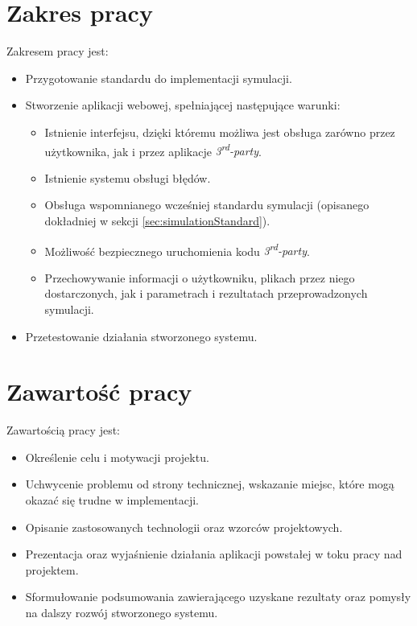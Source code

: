 
\section{Zakres pracy}
\label{sec:zakresPracy}

Zakresem pracy jest:
\begin{itemize}
	\item Przygotowanie standardu do implementacji symulacji.
	\item Stworzenie aplikacji webowej, spełniającej następujące warunki:
	      \begin{itemize}
		      \item Istnienie interfejsu, dzięki któremu możliwa jest obsługa zarówno przez użytkownika, jak i przez aplikacje \emph{3\textsuperscript{rd}-party}.
		      \item Istnienie systemu obsługi błędów.
		      \item Obsługa wspomnianego wcześniej standardu symulacji (opisanego dokładniej w sekcji \ref{sec:simulationStandard}).
		      \item Możliwość bezpiecznego uruchomienia kodu \emph{3\textsuperscript{rd}-party}.
		      \item Przechowywanie informacji o użytkowniku, plikach przez niego dostarczonych, jak i parametrach i rezultatach przeprowadzonych symulacji.
	      \end{itemize}
	\item Przetestowanie działania stworzonego systemu.
\end{itemize}


\section{Zawartość pracy}
\label{sec:zawartoscPracy}

Zawartością pracy jest:
\begin{itemize}
	\item Określenie celu i motywacji projektu.
	\item Uchwycenie problemu od strony technicznej, wskazanie miejsc, które mogą okazać się trudne w implementacji.
	\item Opisanie zastosowanych technologii oraz wzorców projektowych.
	\item Prezentacja oraz wyjaśnienie działania aplikacji powstałej w toku pracy nad projektem.
	\item Sformułowanie podsumowania zawierającego uzyskane rezultaty oraz pomysły na dalszy rozwój stworzonego systemu.
\end{itemize}